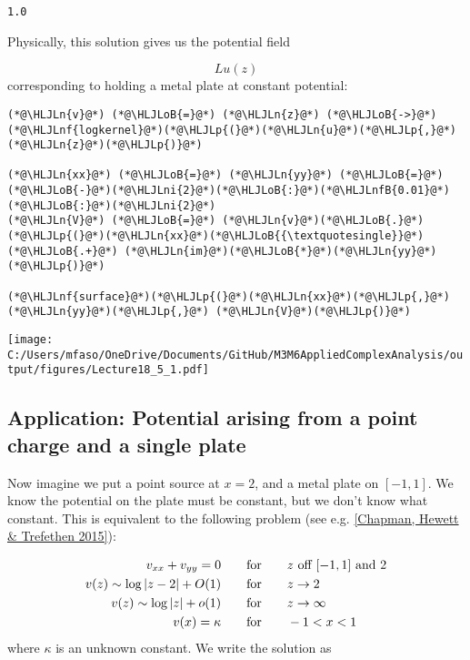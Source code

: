 \documentclass[12pt,landscape]{article}
\newcommand{\HLJLn}[1]{#1}
\newcommand{\HLJLnf}[1]{\textcolor[RGB]{66,102,213}{#1}}
\newcommand{\HLJLnfB}[1]{\textcolor[RGB]{59,151,46}{#1}}
\newcommand{\HLJLni}[1]{\textcolor[RGB]{59,151,46}{#1}}
\newcommand{\HLJLoB}[1]{\textcolor[RGB]{102,102,102}{\textbf{#1}}}
\newcommand{\HLJLp}[1]{#1}
\def\qqfor{\qquad\hbox{for}\qquad}
\begin{document}
{\begin{lstlisting}
1.0
\end{lstlisting}


Physically, this solution gives us the potential field

\[
L u(z)
\]
corresponding to holding a metal plate at constant potential:


\begin{lstlisting}
(*@\HLJLn{v}@*) (*@\HLJLoB{=}@*) (*@\HLJLn{z}@*) (*@\HLJLoB{->}@*) (*@\HLJLnf{logkernel}@*)(*@\HLJLp{(}@*)(*@\HLJLn{u}@*)(*@\HLJLp{,}@*) (*@\HLJLn{z}@*)(*@\HLJLp{)}@*)

(*@\HLJLn{xx}@*) (*@\HLJLoB{=}@*) (*@\HLJLn{yy}@*) (*@\HLJLoB{=}@*) (*@\HLJLoB{-}@*)(*@\HLJLni{2}@*)(*@\HLJLoB{:}@*)(*@\HLJLnfB{0.01}@*)(*@\HLJLoB{:}@*)(*@\HLJLni{2}@*)
(*@\HLJLn{V}@*) (*@\HLJLoB{=}@*) (*@\HLJLn{v}@*)(*@\HLJLoB{.}@*)(*@\HLJLp{(}@*)(*@\HLJLn{xx}@*)(*@\HLJLoB{{\textquotesingle}}@*) (*@\HLJLoB{.+}@*) (*@\HLJLn{im}@*)(*@\HLJLoB{*}@*)(*@\HLJLn{yy}@*)(*@\HLJLp{)}@*)

(*@\HLJLnf{surface}@*)(*@\HLJLp{(}@*)(*@\HLJLn{xx}@*)(*@\HLJLp{,}@*) (*@\HLJLn{yy}@*)(*@\HLJLp{,}@*) (*@\HLJLn{V}@*)(*@\HLJLp{)}@*)
\end{lstlisting}

\texttt{[image: C:/Users/mfaso/OneDrive/Documents/GitHub/M3M6AppliedComplexAnalysis/output/figures/Lecture18\_5\_1.pdf]}

\subsection{Application: Potential arising from a point charge and a single plate}
Now imagine we put a point source at $x = 2$, and a metal plate on $[-1,1]$. We know the potential on the plate must be constant, but we don't know what constant. This is equivalent to the following problem (see e.g. \href{https://people.maths.ox.ac.uk/trefethen/chapman_hewett_trefethen.pdf}{[Chapman, Hewett \& Trefethen 2015]}):


\begin{align*}
v_{xx} + v_{yy} = 0 &\qqfor \hbox{$z$ off $[-1,1]$ and $2$}  \\
v(z) \sim \log |z - 2| + O(1) &\qqfor z \rightarrow 2 \\
v(z) \sim \log|z| + o(1) &\qqfor z \rightarrow \infty \\
v(x) = \kappa &\qqfor -1 < x < 1
\end{align*}
where $\kappa$ is an unknown constant.  We write the solution as

}
\end{document}
